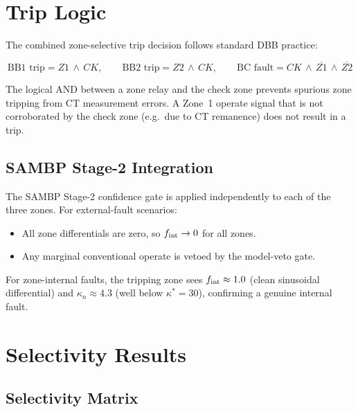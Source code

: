 \documentclass[12pt,a4paper]{article}
\newcommand{\kn}{\kappa_n}
\newcommand{\fint}{f_{\rm int}}
\begin{document}
\section{Trip Logic}

The combined zone-selective trip decision follows standard DBB practice:

\begin{equation}
  \text{BB1 trip} = Z1\,\wedge\,CK, \qquad
  \text{BB2 trip} = Z2\,\wedge\,CK, \qquad
  \text{BC fault} = CK\,\wedge\,\overline{Z1}\,\wedge\,\overline{Z2}
  \label{eq:trip_logic}
\end{equation}

The logical AND between a zone relay and the check zone prevents
spurious zone tripping from CT measurement errors.  A Zone~1 operate
signal that is not corroborated by the check zone (e.g.\ due to CT
remanence) does not result in a trip.

\subsection{SAMBP Stage-2 Integration}

The SAMBP Stage-2 confidence gate is applied independently to each
of the three zones.  For external-fault scenarios:
\begin{itemize}
  \item All zone differentials are zero, so $\fint \to 0$ for all zones.
  \item Any marginal conventional operate is vetoed by the model-veto gate.
\end{itemize}

For zone-internal faults, the tripping zone sees $\fint \approx 1.0$
(clean sinusoidal differential) and $\kn \approx 4.3$ (well below
$\kappa^* = 30$), confirming a genuine internal fault.

\section{Selectivity Results}

\subsection{Selectivity Matrix}
\end{document}
